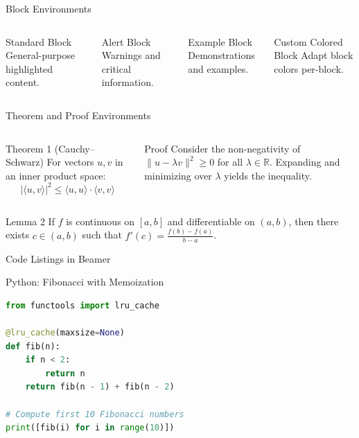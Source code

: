 \documentclass[
  doctype=beamer,
  beameraspectratio=169,
  beamertheme=Madrid,
  institution=generic,
]{omnilatex}
\begin{document}
\begin{frame}{Block Environments}
  \begin{columns}[T]
    \begin{block}{Standard Block}
      General-purpose highlighted content.
    \end{block}
    \begin{alertblock}{Alert Block}
      Warnings and critical information.
    \end{alertblock}

    \begin{exampleblock}{Example Block}
      Demonstrations and examples.
    \end{exampleblock}
    \begin{block}{Custom Colored Block}
      Adapt block colors per-block.
    \end{block}
  \end{columns}
\end{frame}

\begin{frame}{Theorem and Proof Environments}
  \begin{columns}[T]
    \begin{block}{Theorem 1 (Cauchy--Schwarz)}
      For vectors $u, v$ in an inner product space:
      \[
        |\langle u, v \rangle|^2 \leq \langle u, u \rangle \cdot \langle v, v \rangle
      \]
    \end{block}

    \begin{block}{Proof}
      Consider the non-negativity of $\|u - \lambda v\|^2 \geq 0$ for all $\lambda \in \mathbb{R}$.
      Expanding and minimizing over $\lambda$ yields the inequality.
    \end{block}
  \end{columns}

  \begin{block}{Lemma 2}
    If $f$ is continuous on $[a,b]$ and differentiable on $(a,b)$, then there exists $c \in (a,b)$ such that $f'(c) = \frac{f(b)-f(a)}{b-a}$.
  \end{block}
\end{frame}

\begin{frame}[fragile]{Code Listings in Beamer}
  \begin{block}{Python: Fibonacci with Memoization}
    \begin{lstlisting}[language=Python]
from functools import lru_cache

@lru_cache(maxsize=None)
def fib(n):
    if n < 2:
        return n
    return fib(n - 1) + fib(n - 2)

# Compute first 10 Fibonacci numbers
print([fib(i) for i in range(10)])
    \end{lstlisting}
  \end{block}
\end{frame}
\end{document}
